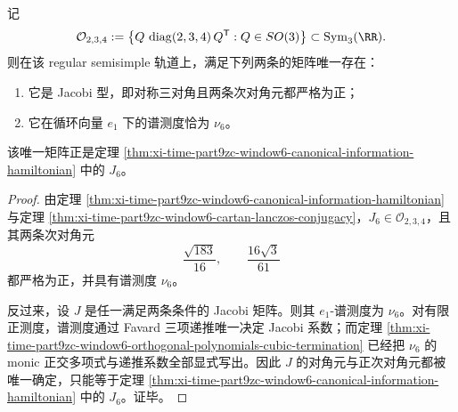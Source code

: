 \begin{theorem}\label{thm:xi-time-part9zd-window6-unique-positive-jacobi-section}
记
\[
\mathcal O_{2,3,4}
:=
\left\{
Q\,\operatorname{diag}(2,3,4)\,Q^{\mathsf T}:Q\in SO(3)
\right\}
\subset \operatorname{Sym}_3(\RR).
\]
则在该 regular semisimple 轨道上，满足下列两条的矩阵唯一存在：
\begin{enumerate}
  \item 它是 Jacobi 型，即对称三对角且两条次对角元都严格为正；
  \item 它在循环向量 \(e_1\) 下的谱测度恰为 \(\nu_6\)。
\end{enumerate}
该唯一矩阵正是定理 \ref{thm:xi-time-part9zc-window6-canonical-information-hamiltonian} 中的 \(J_6\)。
\end{theorem}
\begin{proof}
由定理 \ref{thm:xi-time-part9zc-window6-canonical-information-hamiltonian} 与定理 \ref{thm:xi-time-part9zc-window6-cartan-lanczos-conjugacy}，\(J_6\in \mathcal O_{2,3,4}\)，且其两条次对角元
\[
\frac{\sqrt{183}}{16},
\qquad
\frac{16\sqrt3}{61}
\]
都严格为正，并具有谱测度 \(\nu_6\)。

反过来，设 \(J\) 是任一满足两条条件的 Jacobi 矩阵。则其 \(e_1\)-谱测度为 \(\nu_6\)。对有限正测度，谱测度通过 Favard 三项递推唯一决定 Jacobi 系数；而定理 \ref{thm:xi-time-part9zc-window6-orthogonal-polynomials-cubic-termination} 已经把 \(\nu_6\) 的 monic 正交多项式与递推系数全部显式写出。因此 \(J\) 的对角元与正次对角元都被唯一确定，只能等于定理 \ref{thm:xi-time-part9zc-window6-canonical-information-hamiltonian} 中的 \(J_6\)。证毕。
\end{proof}

